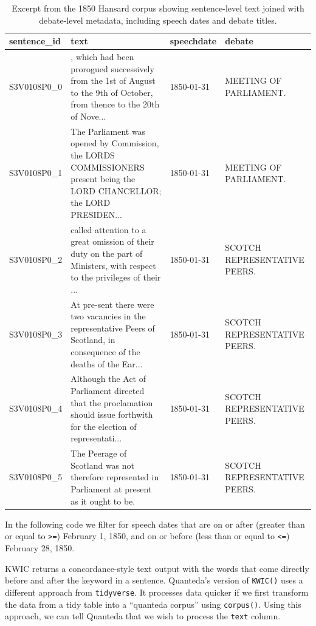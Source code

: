 \documentclass[
]{article}
\begin{document}
\begin{table}

\caption{\label{tab:show_hansard_1850_with_metadata}Excerpt from the 1850 Hansard corpus showing sentence-level 
                  text joined with debate-level metadata, including speech dates 
                  and debate titles.}
\begin{tabular}[t]{l>{\raggedright\arraybackslash}p{6cm}l>{\raggedright\arraybackslash}p{4cm}}
\toprule
sentence\_id & text & speechdate & debate\\
\midrule
S3V0108P0\_0 & , which had been prorogued successively from the 1st of August to the 9th of October, from thence to the 20th of Nove... & 1850-01-31 & MEETING OF PARLIAMENT.\\
S3V0108P0\_1 & The Parliament was opened by Commission, the LORDS COMMISSIONERS present being the LORD CHANCELLOR; the LORD PRESIDEN... & 1850-01-31 & MEETING OF PARLIAMENT.\\
S3V0108P0\_2 & called attention to a great omission of their duty on the part of Ministers, with respect to the privileges of their ... & 1850-01-31 & SCOTCH REPRESENTATIVE PEERS.\\
S3V0108P0\_3 & At pre-sent there were two vacancies in the representative Peers of Scotland, in consequence of the deaths of the Ear... & 1850-01-31 & SCOTCH REPRESENTATIVE PEERS.\\
S3V0108P0\_4 & Although the Act of Parliament directed that the proclamation should issue forthwith for the election of representati... & 1850-01-31 & SCOTCH REPRESENTATIVE PEERS.\\
\addlinespace
S3V0108P0\_5 & The Peerage of Scotland was not therefore represented in Parliament at present as it ought to be. & 1850-01-31 & SCOTCH REPRESENTATIVE PEERS.\\
\bottomrule
\end{tabular}
\end{table}

In the following code we filter for speech dates that are on or after
(greater than or equal to \texttt{\textgreater{}=}) February 1, 1850,
and on or before (less than or equal to \texttt{\textless{}=}) February
28, 1850.

KWIC returns a concordance-style text output with the words that come
directly before and after the keyword in a sentence. Quanteda's version
of \texttt{KWIC()} uses a different approach from \texttt{tidyverse}. It
processes data quicker if we first transform the data from a tidy table
into a ``quanteda corpus'' using \texttt{corpus()}. Using this approach,
we can tell Quanteda that we wish to process the \texttt{text} column.
\end{document}
